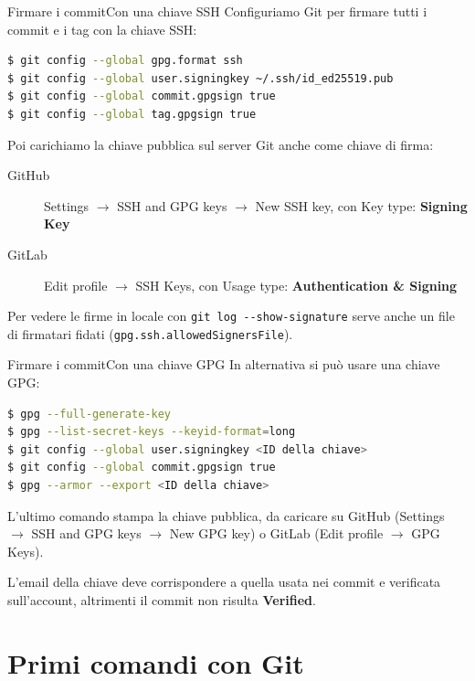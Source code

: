 \documentclass[aspectratio=169,handout,10pt]{beamer}
\begin{document}
\begin{frame}[fragile]{Firmare i commit}{Con una chiave SSH}
    Configuriamo Git per firmare tutti i commit e i tag con la chiave SSH:
    \begin{lstlisting}[language=bash]
$ git config --global gpg.format ssh
$ git config --global user.signingkey ~/.ssh/id_ed25519.pub
$ git config --global commit.gpgsign true
$ git config --global tag.gpgsign true\end{lstlisting}
    Poi carichiamo la chiave pubblica sul server Git anche come chiave di firma:
    \begin{description}
        \item[GitHub] Settings \(\rightarrow\) SSH and GPG keys \(\rightarrow\) New SSH key, con Key type: \textbf{Signing Key}
        \item[GitLab] Edit profile \(\rightarrow\) SSH Keys, con Usage type: \textbf{Authentication \& Signing}
    \end{description}
    Per vedere le firme in locale con \lstinline{git log --show-signature} serve anche un file di firmatari fidati (\lstinline{gpg.ssh.allowedSignersFile}).
\end{frame}
\begin{frame}[fragile]{Firmare i commit}{Con una chiave GPG}
    In alternativa si può usare una chiave GPG:
    \begin{lstlisting}[language=bash]
$ gpg --full-generate-key
$ gpg --list-secret-keys --keyid-format=long
$ git config --global user.signingkey <ID della chiave>
$ git config --global commit.gpgsign true
$ gpg --armor --export <ID della chiave>\end{lstlisting}
    L'ultimo comando stampa la chiave pubblica, da caricare su GitHub (Settings \(\rightarrow\) SSH and GPG keys \(\rightarrow\) New GPG key) o GitLab (Edit profile \(\rightarrow\) GPG Keys).

    L'email della chiave deve corrispondere a quella usata nei commit e verificata sull'account, altrimenti il commit non risulta \textbf{Verified}.
\end{frame}

\section{Primi comandi con Git}
\end{document}
